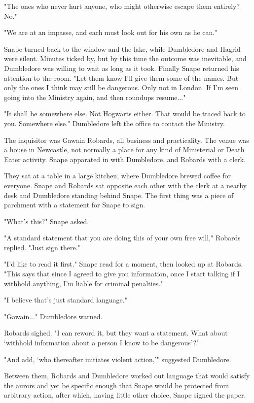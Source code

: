 "The ones who never hurt anyone, who might otherwise escape them entirely? No."

"We are at an impasse, and each must look out for his own as he can."

Snape turned back to the window and the lake, while Dumbledore and Hagrid were silent. Minutes ticked by, but by this time the outcome was inevitable, and Dumbledore was willing to wait as long as it took. Finally Snape returned his attention to the room. "Let them know I'll give them some of the names. But only the ones I think may still be dangerous. Only not in London. If I'm seen going into the Ministry again, and then roundups resume..."

"It shall be somewhere else. Not Hogwarts either. That would be traced back to you. Somewhere else." Dumbledore left the office to contact the Ministry.

The inquisitor was Gawain Robards, all business and practicality. The venue was a house in Newcastle, not normally a place for any kind of Ministerial or Death Eater activity. Snape apparated in with Dumbledore, and Robards with a clerk.

They sat at a table in a large kitchen, where Dumbledore brewed coffee for everyone. Snape and Robards sat opposite each other with the clerk at a nearby desk and Dumbledore standing behind Snape. The first thing was a piece of parchment with a statement for Snape to sign.

"What's this?" Snape asked.

"A standard statement that you are doing this of your own free will," Robards replied. "Just sign there."

"I'd like to read it first." Snape read for a moment, then looked up at Robards. "This says that since I agreed to give you information, once I start talking if I withhold anything, I'm liable for criminal penalties."

"I believe that's just standard language."

"Gawain..." Dumbledore warned.

Robards sighed. "I can reword it, but they want a statement. What about `withhold information about a person I know to be dangerous'?"

"And add, `who thereafter initiates violent action,'" suggested Dumbledore.

Between them, Robards and Dumbledore worked out language that would satisfy the aurors and yet be specific enough that Snape would be protected from arbitrary action, after which, having little other choice, Snape signed the paper.


